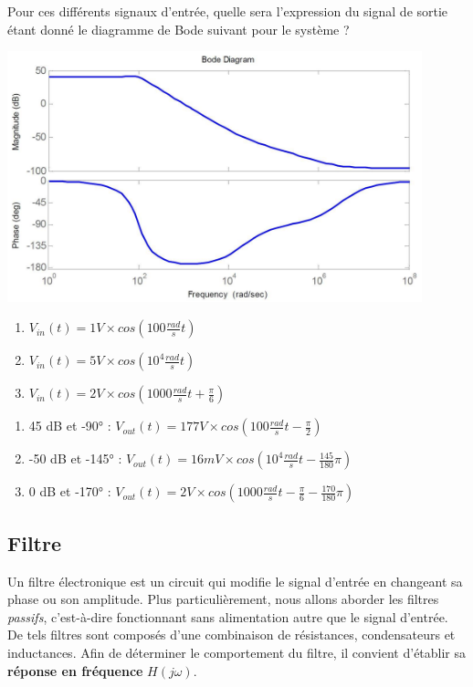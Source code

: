 {
Pour ces différents signaux d'entrée, quelle sera l'expression du signal de sortie étant donné le diagramme de Bode suivant pour le système ?
\begin{center}
\includegraphics[width=12cm]{exo_bode}
\end{center}

\begin{enumerate}
\item $V_{in}(t)=1V\times cos(100\frac{rad}{s}t)$
\item $V_{in}(t)=5V\times cos(10^4\frac{rad}{s}t)$
\item $V_{in}(t)=2V\times cos(1000\frac{rad}{s}t+\frac{\pi}{6})$
\end{enumerate}
}
{
  \begin{enumerate}
    \item 45 dB et -90° : $V_{out}(t) = 177 V \times cos(100\frac{rad}{s}t - \frac{\pi}{2})$
    \item -50 dB et -145° : $V_{out}(t) = 16 mV\times cos(10^4\frac{rad}{s}t - \frac{145}{180}\pi)$
    \item 0 dB et -170° : $V_{out}(t) = 2 V\times cos(1000\frac{rad}{s}t - \frac{\pi}{6} - \frac{170}{180}\pi)$
  \end{enumerate}
}


\subsection{Filtre}
Un filtre électronique est un circuit  qui modifie le signal d'entrée en changeant sa phase ou son amplitude.
Plus particulièrement, nous allons aborder les filtres \textit{passifs}, c'est-à-dire fonctionnant sans alimentation autre que le signal d'entrée.
De tels filtres sont composés d'une combinaison de résistances, condensateurs et inductances.
Afin de déterminer le comportement du filtre, il convient d'établir sa \textbf{réponse en fréquence} $H(j\omega)$.

